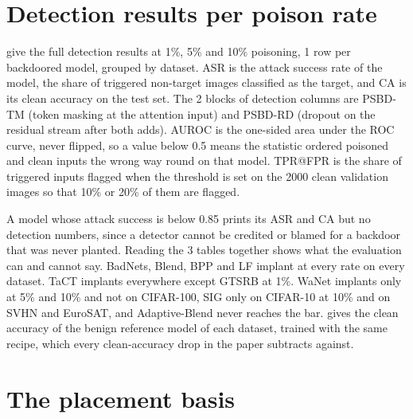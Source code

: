 \section{Detection results per poison rate}
\label{app:results}

 give the full detection results at 1\%, 5\% and 10\% poisoning, 1 row per backdoored model, grouped by dataset. ASR is the attack success rate of the model, the share of triggered non-target images classified as the target, and CA is its clean accuracy on the test set. The 2 blocks of detection columns are PSBD-TM (token masking at the attention input) and PSBD-RD (dropout on the residual stream after both adds). AUROC is the one-sided area under the ROC curve, never flipped, so a value below 0.5 means the statistic ordered poisoned and clean inputs the wrong way round on that model. TPR@FPR is the share of triggered inputs flagged when the threshold is set on the 2000 clean validation images so that 10\% or 20\% of them are flagged.

A model whose attack success is below 0.85 prints its ASR and CA but no detection numbers, since a detector cannot be credited or blamed for a backdoor that was never planted. Reading the 3 tables together shows what the evaluation can and cannot say. BadNets, Blend, BPP and LF implant at every rate on every dataset. TaCT implants everywhere except GTSRB at 1\%. WaNet implants only at 5\% and 10\% and not on CIFAR-100, SIG only on CIFAR-10 at 10\% and on SVHN and EuroSAT, and Adaptive-Blend never reaches the bar.  gives the clean accuracy of the benign reference model of each dataset, trained with the same recipe, which every clean-accuracy drop in the paper subtracts against.





\FloatBarrier


\FloatBarrier

\section{The placement basis}
\label{app:basis}

